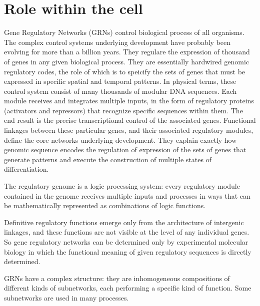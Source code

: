 \section{Role within the cell}

Gene Regulatory Networks (GRNs) control biological process of all organisms. The complex control systems underlying development have probably been evolving for more than a billion years. They regulare the expression of thousand of genes in any given biological process. They are essentially hardwired genomic regulatory codes, the role of which is to speicify the sets of genes that must be expressed in specific spatial and temporal patterns. In physical terms, these control system consist of many thousands of modular DNA sequences. Each module receives and integrates multiple inputs, in the form of regulatory proteins (activators and repressors) that recognize specific sequences within them. The end result is the precise transcriptional control of the associated genes. 
Functional linkages between these particular genes, and their associated regulatory modules, define the core networks underlying development. They explain exactly how genomic sequence encodes the regulation of expression of the sets of genes that generate patterns and execute the construction of multiple states of differentiation.

The regulatory genome is a logic processing system: every regulatory module contained in the genome receives multiple inputs and processes in ways that can be mathematically represented as combinations of logic functions. 

Definitive regulatory functions emerge only from the architecture of intergenic linkages, and these functions are not visible at the level of any individual genes. So gene regulatory networks can be determined only by experimental molecular biology in which the functional meaning of given regulatory sequences is directly determined.

GRNs have a complex structure: they are inhomogeneous compositions of different kinds of subnetworks, each performing a specific kind of function. Some subnetworks are used in many processes.
